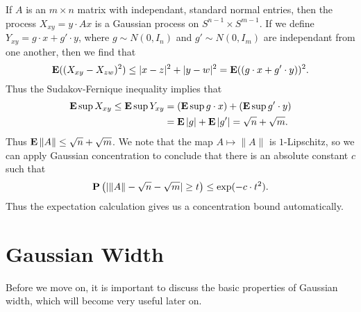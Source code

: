 \begin{example}
	If $A$ is an $m \times n$ matrix with independant, standard normal entries, then the process $X_{xy} = y \cdot Ax$ is a Gaussian process on $S^{n-1} \times S^{m-1}$. If we define $Y_{xy} = g \cdot x + g' \cdot y$, where $g \sim N(0,I_n)$ and $g' \sim N(0,I_m)$ are independant from one another, then we find that
	\[ \operatorname{\mathbf{E}}((X_{xy} - X_{zw})^2) \leq |x-z|^2 + |y-w|^2 = \operatorname{\mathbf{E}}((g \cdot x + g' \cdot y))^2. \]
	Thus the Sudakov-Fernique inequality implies that
	\begin{align*}
		\operatorname{\mathbf{E}} \sup X_{xy} \leq \operatorname{\mathbf{E}} \sup Y_{xy} &= (\operatorname{\mathbf{E}} \sup g \cdot x) + (\operatorname{\mathbf{E}} \sup g' \cdot y)\\
		&= \operatorname{\mathbf{E}} |g| + \operatorname{\mathbf{E}} |g'| = \sqrt{n} + \sqrt{m}.
	\end{align*}
	Thus $\operatorname{\mathbf{E}} \| A \| \leq \sqrt{n} + \sqrt{m}$. We note that the map $A \mapsto \| A \|$ is $1$-Lipschitz, so we can apply Gaussian concentration to conclude that there is an absolute constant $c$ such that
	\[ \operatorname{\mathbf{P}} \left( |\| A \| - \sqrt{n} - \sqrt{m}| \geq t \right) \leq \exp(-c \cdot t^2). \]
	Thus the expectation calculation gives us a concentration bound automatically.
\end{example}

\section{Gaussian Width}

Before we move on, it is important to discuss the basic properties of Gaussian width, which will become very useful later on.

